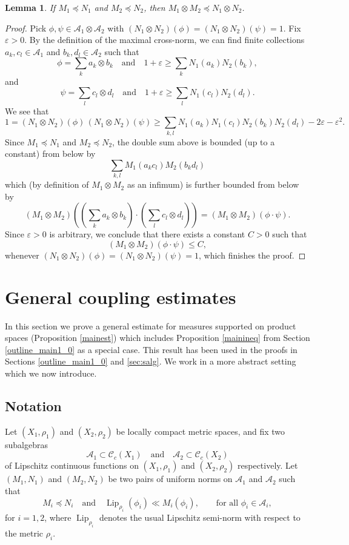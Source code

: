 \documentclass[11pt,reqno,a4paper]{amsart}
\numberwithin{equation}{section}
\newcommand{\cA}{\mathcal{A}}
\newcommand{\cC}{\mathcal{C}}
\newcommand{\qand}{\quad \textrm{and} \quad}
\newcommand{\eps}{\varepsilon}
\DeclareMathOperator{\Lip}{Lip}
\theoremstyle{theorem}
\newtheorem{lemma}[theorem]{Lemma}
\theoremstyle{definition}
\begin{document}
\begin{lemma}
\label{lemma:tensorprodpreceq}
If $M_1 \preceq N_1$ and $M_2 \preceq N_2$, then $M_1 \otimes M_2 \preceq N_1 \otimes N_2$.
\end{lemma}

\begin{proof}
Pick $\phi, \psi \in \cA_1 \otimes \cA_2$ with $(N_1 \otimes N_2)(\phi) = (N_1 \otimes N_2)(\psi) = 1$. Fix $\eps > 0$.
By the definition of the maximal cross-norm, we can find finite collections $a_k, c_l \in \cA_1$ and $b_k, d_l \in \cA_2$ such that
\[
\phi = \sum_k a_k \otimes b_k \qand 1+\eps \geq \sum_k N_1(a_k) N_2(b_k),
\] 
and
\[
\psi = \sum_l c_l \otimes d_l \qand 1+\eps \geq \sum_l N_1(c_l) N_2(d_l).
\] 
We see that
\[
1 = (N_1 \otimes N_2)(\phi) \, (N_1 \otimes N_2)(\psi)
\geq 
\sum_{k,l} N_1(a_k) N_1(c_l) N_2(b_k) N_2(d_l) - 2\eps - \eps^2.
\]
Since $M_1 \preceq N_1$ and $M_2 \preceq N_2$, the double sum above is bounded (up to a constant) from 
below by
\[
\sum_{k,l} M_1(a_k c_l) M_2(b_k d_l)
\]
which (by definition of $M_1 \otimes M_2$ as an infimum) is further bounded from below by
\[
(M_1 \otimes M_2)\left( \left(\sum_k a_k \otimes b_k\right) \cdot \left(\sum_l c_l \otimes d_l\right) \right) = (M_1 \otimes M_2)(\phi\cdot \psi).
\]
Since $\eps > 0$ is arbitrary, we conclude that there exists a constant $C>0$ such that 
\[
(M_1 \otimes M_2)(\phi\cdot \psi) \leq C,
\]
whenever $(N_1 \otimes N_2)(\phi) = (N_1 \otimes N_2)(\psi) = 1$, which finishes the proof.
\end{proof}

\section{General coupling estimates}
\label{PrfABCDT}

In this section we prove a general estimate for measures supported on product spaces
(Proposition \ref{mainest}) which includes Proposition \ref{mainineq} 
from Section \ref{outline_main1_0} as a special case.
This result  has been used in the proofs in Sections
\ref{outline_main1_0} and \ref{sec:salg}.
We work in a more abstract setting which we now introduce. 

\subsection{Notation}

Let $(X_1,\rho_1)$ and $(X_2,\rho_2)$ be locally compact metric spaces, and fix two subalgebras 
\[
\cA_1 \subset\cC_c(X_1) \qand \cA_2 \subset\cC_c(X_2)
\] 
of Lipschitz continuous functions 
on $(X_1,\rho_1)$ and $(X_2,\rho_2)$ respectively. Let $(M_1,N_1)$ and $(M_2,N_2)$ be two pairs of 
uniform norms on $\cA_1$ and $\cA_2$ such that 
\begin{equation}
\label{ass:norms}
M_i \preceq N_i \qand \Lip_{\rho_i}(\phi_i) \ll M_i(\phi_i), \quad\quad \textrm{for all $\phi_i \in \cA_i$},
\end{equation}
for $i = 1,2$, where $\Lip_{\rho_i}$ denotes the usual Lipschitz semi-norm with respect to the metric $\rho_i$. \\
\end{document}
